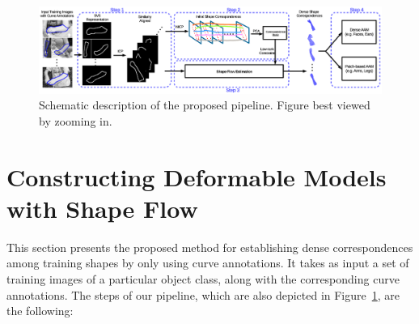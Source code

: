 \begin{figure}[t!]
    \centering
        \includegraphics[width=\textwidth]{resources/architecture3}
    \caption{Schematic description of the proposed pipeline. Figure best viewed by zooming in.}
    \label{fig:archi}
\end{figure}

\section{Constructing Deformable Models with Shape Flow}




This section presents the proposed method for establishing dense correspondences among training shapes 
by only using curve annotations.
%
%
%
It takes as input a set of training images of a particular object class, along with the corresponding curve annotations. The steps of our pipeline, which are also depicted in Figure~\ref{fig:archi}, are the following:

